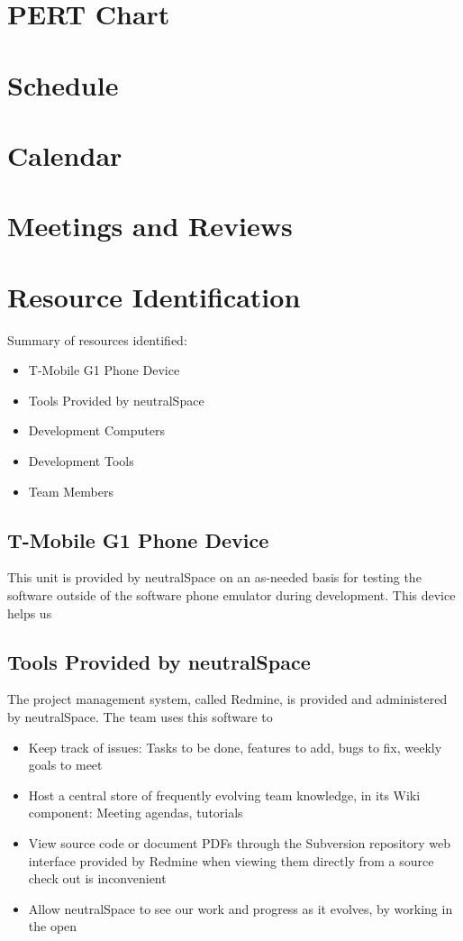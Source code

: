\documentclass[11pt]{article}
\begin{document}
\section{PERT Chart}
\section{Schedule}
\section{Calendar}
\section{Meetings and Reviews}
\section{Resource Identification}
	Summary of resources identified:
	\begin{itemize}
		\item{T-Mobile G1 Phone Device}
		\item{Tools Provided by neutralSpace}
		\item{Development Computers}
		\item{Development Tools}
		\item{Team Members}
	\end{itemize}

	\subsection{T-Mobile G1 Phone Device}
		This unit is provided by neutralSpace on an as-needed basis for testing the software outside of the software phone emulator during development. This device helps us 

	\subsection{Tools Provided by neutralSpace}
		The project management system, called Redmine, is provided and administered by neutralSpace. The team uses this software to
		\begin{itemize}
			\item{Keep track of issues: Tasks to be done, features to add, bugs to fix, weekly goals to meet}
			\item{Host a central store of frequently evolving team knowledge, in its Wiki component: Meeting agendas, tutorials}
			\item{View source code or document PDFs through the Subversion repository web interface provided by Redmine when viewing them directly from a source check out is inconvenient}
			\item{Allow neutralSpace to see our work and progress as it evolves, by working in the open}
		\end{itemize}
\end{document}
